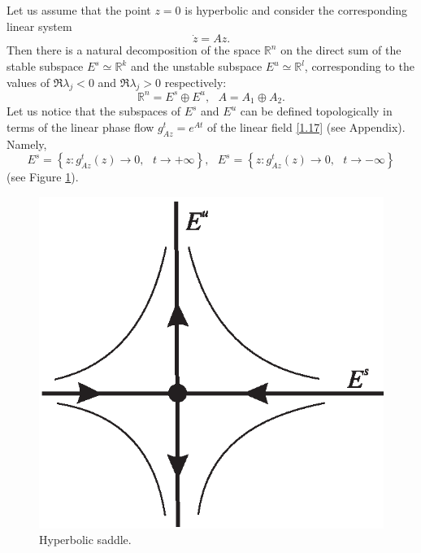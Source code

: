 Let us assume that the point $z = 0$ is hyperbolic and consider the corresponding linear system
\begin{equation}
\label{1.17}
\dot{z}=Az.
\end{equation}
Then there is a natural decomposition of the space $\mathbb{R}^n$ on the direct sum of the stable subspace $E^s \simeq \mathbb{R}^k$ and the unstable subspace $E^u \simeq \mathbb{R}^l$, corresponding to the values of $\Re \lambda_j <0$ and $\Re \lambda_j> 0$ respectively:
\begin{equation}
\label{1.18}
\mathbb{R}^{n}=E^{s}\oplus E^{u},\text{ \ \ }A=A_{1}\oplus A_{2}.
\end{equation}
Let us notice that the subspaces of $E^s$ and $E^u$ can be defined topologically in terms of the linear phase flow $g_{Az}^{t}=e^{At}$ of the linear field \eqref{1.17} (see Appendix). Namely,
$$
E^{s}=\left\{ z:g_{Az}^{t}(z)\rightarrow 0,\text{ }t\rightarrow +\infty
\right\} ,\text{ \ }E^{s}=\left\{ z:g_{Az}^{t}(z)\rightarrow 0,\text{ }%
t\rightarrow -\infty \right\}
$$
(see Figure \ref{fig:17}).

\begin{figure}[!ht]
	\centering
	\includegraphics [scale=1.4]{jtr17}
	\caption{Hyperbolic saddle.}
	\label{fig:17}
\end{figure}

